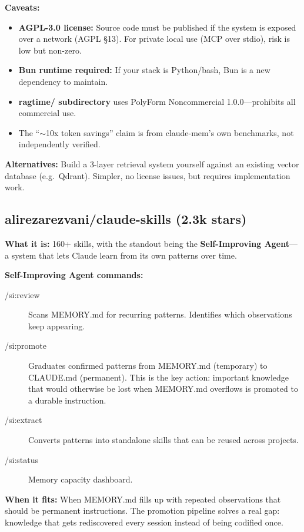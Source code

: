 \documentclass[11pt,a4paper]{article}
\begin{document}
\textbf{Caveats:}
\begin{itemize}
  \item \textbf{AGPL-3.0 license:} Source code must be published if the system is exposed over a network (AGPL \S 13). For private local use (MCP over stdio), risk is low but non-zero.
  \item \textbf{Bun runtime required:} If your stack is Python/bash, Bun is a new dependency to maintain.
  \item \textbf{ragtime/ subdirectory} uses PolyForm Noncommercial 1.0.0---prohibits all commercial use.
  \item The ``$\sim$10x token savings'' claim is from claude-mem's own benchmarks, not independently verified.
\end{itemize}

\textbf{Alternatives:} Build a 3-layer retrieval system yourself against an existing vector database (e.g.\ Qdrant). Simpler, no license issues, but requires implementation work.

\subsection{alirezarezvani/claude-skills (2.3k stars)}

\textbf{What it is:} 160+ skills, with the standout being the \textbf{Self-Improving Agent}---a system that lets Claude learn from its own patterns over time.

\textbf{Self-Improving Agent commands:}
\begin{description}
  \item[/si:review] Scans MEMORY.md for recurring patterns. Identifies which observations keep appearing.
  \item[/si:promote] Graduates confirmed patterns from MEMORY.md (temporary) to CLAUDE.md (permanent). This is the key action: important knowledge that would otherwise be lost when MEMORY.md overflows is promoted to a durable instruction.
  \item[/si:extract] Converts patterns into standalone skills that can be reused across projects.
  \item[/si:status] Memory capacity dashboard.
\end{description}

\textbf{When it fits:} When MEMORY.md fills up with repeated observations that should be permanent instructions. The promotion pipeline solves a real gap: knowledge that gets rediscovered every session instead of being codified once.
\end{document}
